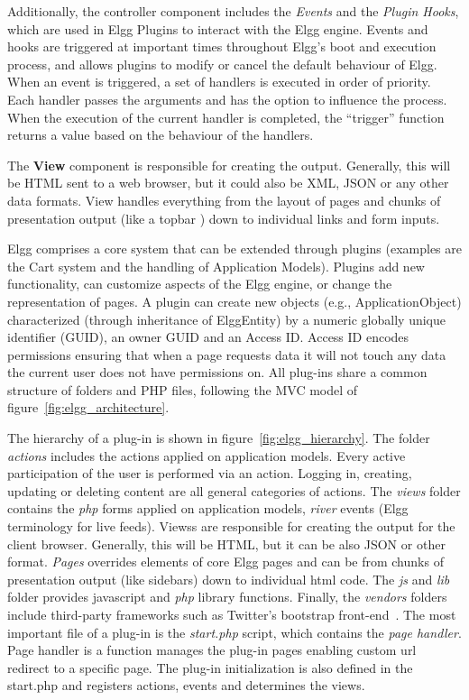 Additionally, the controller component includes the \emph{Events} and the \emph{Plugin Hooks}, which are used in Elgg Plugins to interact with the Elgg engine. Events and hooks are triggered at important times throughout Elgg’s boot and execution process, and allows plugins to modify or cancel the default behaviour of Elgg. When an event is triggered, a set of handlers is executed in order of priority. Each handler passes the arguments and has the option to influence the process. When the execution of the current handler is completed, the ``trigger'' function returns a value based on the behaviour of the handlers.

The {\bf View} component is responsible for creating the output. Generally, this will be HTML sent to a web browser, but it could also be XML, JSON or any other data formats. View handles everything from the layout of pages and chunks of presentation output (like a topbar ) down to individual links and form inputs.

Elgg comprises a core system that can be extended through plugins (examples are the Cart system and the handling of Application Models). Plugins add new functionality, can customize aspects of the Elgg engine, or change the representation of pages.
A plugin can create new objects (e.g., ApplicationObject) characterized (through inheritance of ElggEntity) by a numeric globally unique identifier (GUID), an owner GUID and an Access ID. Access ID encodes permissions ensuring that when a page requests data it will not touch any data the current user does not have permissions on. All plug-ins share a common structure of folders and PHP files, following the MVC model of figure~\ref{fig:elgg_architecture}.  

The hierarchy of a plug-in is shown in figure~\ref{fig:elgg_hierarchy}. 
The folder {\em actions} includes the actions applied on application models. Every active participation of the user is performed via an action. Logging in, creating, updating or deleting content are all general categories of actions.
The {\em views} folder contains the {\em php} forms applied on application models, {\em river} events (Elgg terminology for live feeds). Viewss are responsible for creating the output for the client browser. Generally, this will be HTML, but it can be also JSON or other format. 
{\em Pages} overrides elements of core Elgg pages and can be from chunks of presentation output (like sidebars) down to individual html code.  
The {\em js} and {\em lib} folder provides javascript and {\em php} library functions. 
Finally, the {\em vendors} folders include third-party frameworks such as Twitter's bootstrap front-end~\cite{bootstrap_url}.
The most important file of a plug-in is the \emph{start.php} script, which contains the \emph{page handler}. Page handler is a function manages the plug-in pages enabling custom url redirect to a specific page. 
The plug-in initialization is also defined in the start.php and registers actions, events and determines the views. 

